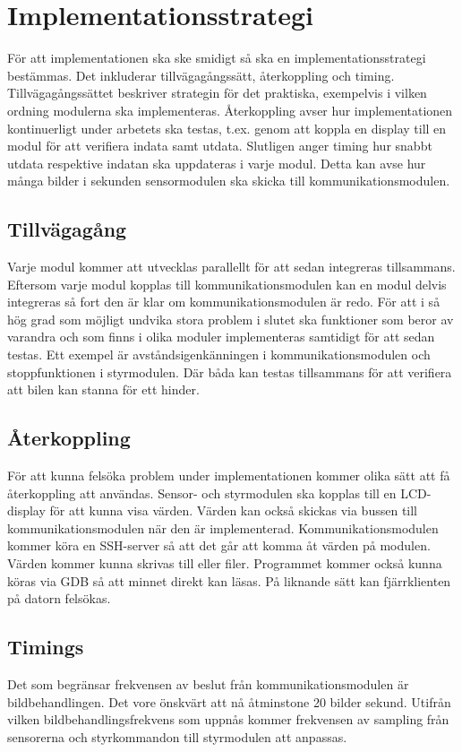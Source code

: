 \documentclass[designspec/spec.tex]{subfiles}
\begin{document}
\section{Implementationsstrategi}

För att implementationen ska ske smidigt så ska en implementationsstrategi
bestämmas. Det inkluderar tillvägagångssätt, återkoppling och timing.
Tillvägagångssättet beskriver strategin för det praktiska, exempelvis i vilken
ordning modulerna ska implementeras. Återkoppling avser hur implementationen
kontinuerligt under arbetets ska testas, t.ex. genom att koppla en display till
en modul för att verifiera indata samt utdata.
Slutligen anger timing hur snabbt utdata respektive indatan ska
uppdateras i varje modul. Detta kan avse hur många bilder i sekunden
sensormodulen ska skicka till kommunikationsmodulen. 

\subsection{Tillvägagång}
Varje modul kommer att utvecklas parallellt för att sedan integreras
tillsammans. Eftersom varje modul kopplas till kommunikationsmodulen kan en
modul delvis integreras så fort den är klar om kommunikationsmodulen är
redo. För att i så hög grad som möjligt undvika stora problem i slutet ska
funktioner som beror av varandra och som finns i olika moduler implementeras
samtidigt för att sedan testas. Ett exempel är avståndsigenkänningen i
kommunikationsmodulen och stoppfunktionen i styrmodulen. Där båda kan testas
tillsammans för att verifiera att bilen kan stanna för ett hinder.

\subsection{Återkoppling}
För att kunna felsöka problem under implementationen kommer olika sätt att få
återkoppling att användas. Sensor- och styrmodulen ska kopplas till en
LCD-display för att kunna visa värden. Värden kan också skickas via bussen till
kommunikationsmodulen när den är implementerad. Kommunikationsmodulen kommer
köra en SSH-server så att det går att komma åt värden på modulen. Värden kommer
kunna skrivas till  eller filer. Programmet kommer också kunna
köras via GDB så att minnet direkt kan läsas. På liknande sätt kan
fjärrklienten på datorn felsökas.

\subsection{Timings}
Det som begränsar frekvensen av beslut från kommunikationsmodulen är
bildbehandlingen. Det vore önskvärt att nå åtminstone 20 bilder sekund. Utifrån
vilken bildbehandlingsfrekvens som uppnås kommer frekvensen av sampling från
sensorerna och styrkommandon till styrmodulen att anpassas. 
\end{document}
